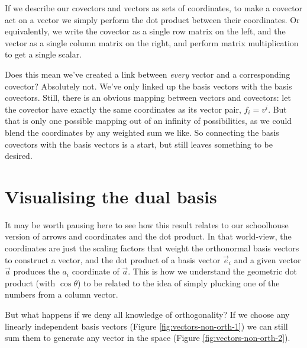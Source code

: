 If we describe our covectors and vectors as sets of coordinates, to make a covector act on a vector we simply perform the dot product between their coordinates. Or equivalently, we write the covector as a single row matrix on the left, and the vector as a single column matrix on the right, and perform matrix multiplication to get a single scalar.

Does this mean we've created a link between \textit{every} vector and a corresponding covector? Absolutely not. We've only linked up the basis vectors with the basis covectors. Still, there is an obvious mapping between vectors and covectors: let the covector have exactly the same coordinates as its vector pair, $f_i = v^i$. But that is only one possible mapping out of an infinity of possibilities, as we could blend the coordinates by any weighted sum we like. So connecting the basis covectors with the basis vectors is a start, but still leaves something to be desired.

\section{Visualising the dual basis}

It may be worth pausing here to see how this result relates to our schoolhouse version of arrows and coordinates and the dot product. In that world-view, the coordinates are just the scaling factors that weight the orthonormal basis vectors to construct a vector, and the dot product of a basis vector $\vec{e}_i$ and a given vector $\vec{a}$ produces the $a_i$ coordinate of $\vec{a}$. This is how we understand the geometric dot product (with $\cos \theta$) to be related to the idea of simply plucking one of the numbers from a column vector.

But what happens if we deny all knowledge of orthogonality? If we choose any linearly independent basis vectors (Figure \ref{fig:vectors-non-orth-1}) we can still sum them to generate any vector in the space (Figure \ref{fig:vectors-non-orth-2}).

